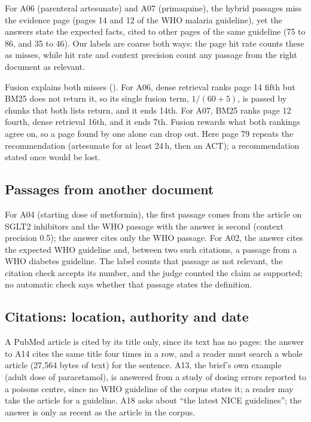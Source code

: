 For A06 (parenteral artesunate) and A07 (primaquine), the hybrid passages miss the evidence page (pages 14 and 12 of the WHO malaria guideline), yet the answers state the expected facts, cited to other pages of the same guideline (75 to 86, and 35 to 46). Our labels are coarse both ways: the page hit rate counts these as misses, while hit rate and context precision count any passage from the right document as relevant.

Fusion explains both misses (). For A06, dense retrieval ranks page 14 fifth but BM25 does not return it, so its single fusion term, $1/(60+5)$, is passed by chunks that both lists return, and it ends 14th. For A07, BM25 ranks page 12 fourth, dense retrieval 16th, and it ends 7th. Fusion rewards what both rankings agree on, so a page found by one alone can drop out. Here page 79 repeats the recommendation (artesunate for at least 24\,h, then an ACT); a recommendation stated once would be lost.

\subsection{Passages from another document}

For A04 (starting dose of metformin), the first passage comes from the article on SGLT2 inhibitors and the WHO passage with the answer is second (context precision 0.5); the answer cites only the WHO passage. For A02, the answer cites the expected WHO guideline and, between two such citations, a passage from a WHO diabetes guideline. The label counts that passage as not relevant, the citation check accepts its number, and the judge counted the claim as supported; no automatic check says whether that passage states the definition.

\subsection{Citations: location, authority and date}

A PubMed article is cited by its title only, since its text has no pages: the answer to A14 cites the same title four times in a row, and a reader must search a whole article (27,564 bytes of text) for the sentence. A13, the brief's own example (adult dose of paracetamol), is answered from a study of dosing errors reported to a poisons centre, since no WHO guideline of the corpus states it; a reader may take the article for a guideline. A18 asks about ``the latest NICE guidelines''; the answer is only as recent as the article in the corpus.
